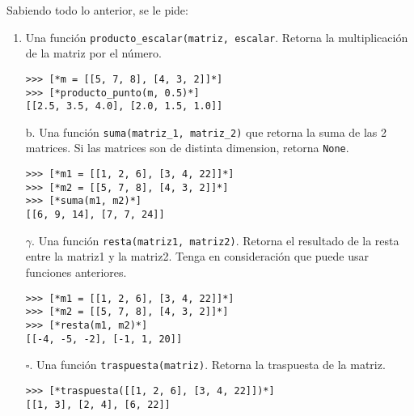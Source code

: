 Sabiendo todo lo anterior, se le pide:
\begin{enumerate}
    \item Una función \texttt{producto\_escalar(matriz, escalar}. Retorna la multiplicación de la matriz por el número.
    \begin{lstlisting}[style=consola]
>>> [*m = [[5, 7, 8], [4, 3, 2]]*]
>>> [*producto_punto(m, 0.5)*]
[[2.5, 3.5, 4.0], [2.0, 1.5, 1.0]]
    \end{lstlisting}
    
    \item[b.] Una función \texttt{suma(matriz\_1, matriz\_2)} que retorna la suma de las 2 matrices. Si las matrices son de distinta dimension, retorna \texttt{None}.
    \begin{lstlisting}[style=consola]
>>> [*m1 = [[1, 2, 6], [3, 4, 22]]*]
>>> [*m2 = [[5, 7, 8], [4, 3, 2]]*]
>>> [*suma(m1, m2)*]
[[6, 9, 14], [7, 7, 24]]
    \end{lstlisting}
    
    \item[$\gamma$.] Una función \texttt{resta(matriz1, matriz2)}. Retorna el resultado de la resta entre la matriz1 y la matriz2. Tenga en consideración que puede usar funciones anteriores.
    \begin{lstlisting}[style=consola]
>>> [*m1 = [[1, 2, 6], [3, 4, 22]]*]
>>> [*m2 = [[5, 7, 8], [4, 3, 2]]*]
>>> [*resta(m1, m2)*]
[[-4, -5, -2], [-1, 1, 20]]
    \end{lstlisting}
    
    \item[$\square$.] Una función \texttt{traspuesta(matriz)}. Retorna la traspuesta de la matriz.
    \begin{lstlisting}[style=consola]
>>> [*traspuesta([[1, 2, 6], [3, 4, 22]])*]
[[1, 3], [2, 4], [6, 22]]
    \end{lstlisting}
    
\end{enumerate}
